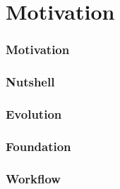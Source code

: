 \part{Motivation}
\section{Motivation}


\section{Nutshell}

\section{Evolution}

% 

% 
\section{Foundation}
% 
% 
% 
\section{Workflow}
% 

